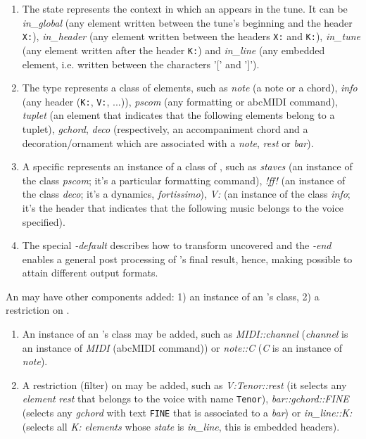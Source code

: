 \begin{enumerate}
  \item The \abc{} state represents the context in which an \abcelement{} appears in the tune. It
  can be \emph{in\_global} (any element written between the tune's beginning and the header
  \texttt{X:}), \emph{in\_header} (any element written between the headers \texttt{X:} and
  \texttt{K:}), \emph{in\_tune} (any element written after the header \texttt{K:}) and
  \emph{in\_line} (any embedded element, i.e. written between the characters '[' and ']').

  \item The \abcelement{} type represents a class of elements, such as \emph{note} (a note or a
  chord), \emph{info} (any \abc{} header (\texttt{K:}, \texttt{V:}, ...)), \emph{pscom} (any
  formatting or abcMIDI command), \emph{tuplet} (an element that indicates that the following
  elements belong to a tuplet), \emph{gchord}, \emph{deco} (respectively, an accompaniment chord and
  a decoration/ornament which are associated with a \emph{note}, \emph{rest} or \emph{bar}).

  \item A specific \abcelement{} represents an instance of a class of \abcelements{}, such as
  \emph{staves} (an instance of the class \emph{pscom}; it's a particular formatting command),
  \emph{!ff!} (an instance of the class \emph{deco}; it's a dynamics, \emph{fortissimo}), \emph{V:}
  (an instance of the class \emph{info}; it's the header that indicates that the following music
  belongs to the voice specified).

  \item The special \actuator{} \emph{-default} describes how to transform uncovered \abcelements{}
  and the \actuator{} \emph{-end} enables a general post processing of \dt{}'s final result, hence,
  making possible to attain different output formats.
\end{enumerate}

An \actuator{} may have other components added: 1) an instance of an \abcelement{}'s class, 2) a
restriction on \abcelements{}.

\begin{enumerate}
  \item An instance of an \abcelement{}'s class may be added, such as \emph{MIDI::channel}
  (\emph{channel} is an instance of \emph{MIDI} (abcMIDI command)) or \emph{note::C}
  (\emph{C} is an instance of \emph{note}).

  \item A restriction (filter) on \abcelements{} may be added, such as \emph{V:Tenor::rest} (it
  selects any \emph{element} \emph{rest} that belongs to the voice with name \texttt{Tenor}),
  \emph{bar::gchord::FINE} (selects any \emph{gchord} with text \texttt{FINE} that is associated to
  a \emph{bar}) or \emph{in\_line::K:} (selects all \emph{K:} \emph{elements} whose \emph{state} is
  \emph{in\_line}, this is embedded headers).
\end{enumerate}

